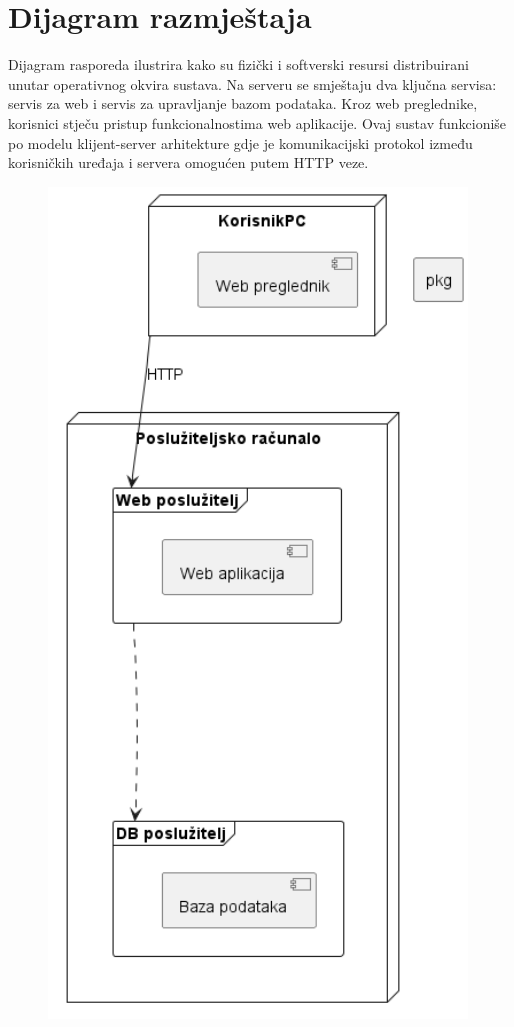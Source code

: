 			\eject 
		
		
		\section{Dijagram razmještaja}
			
			Dijagram rasporeda ilustrira kako su fizički i softverski resursi distribuirani unutar operativnog okvira sustava. Na serveru se smještaju dva ključna servisa: servis za web i servis za upravljanje bazom podataka. Kroz web preglednike, korisnici stječu pristup funkcionalnostima web aplikacije. Ovaj sustav funkcioniše po modelu klijent-server arhitekture gdje je komunikacijski protokol između korisničkih uređaja i servera omogućen putem HTTP veze.

		\begin{figure} [H]
			\includegraphics[width=1\linewidth]{dijagrami/dijagramRazmjestanja.png}

\end{figure}

